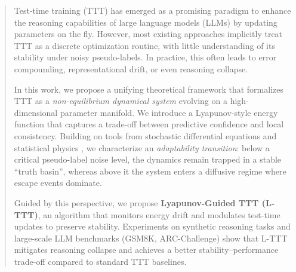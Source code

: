 \documentclass{article}
\theoremstyle{plain}
\theoremstyle{definition}
\theoremstyle{remark}
\begin{document}

\printAffiliationsAndNotice{\icmlEqualContribution} 

\begin{abstract}
Test-time training (TTT) has emerged as a promising paradigm to enhance the reasoning capabilities of large language models (LLMs) by updating parameters on the fly. However, most existing approaches implicitly treat TTT as a discrete optimization routine, with little understanding of its stability under noisy pseudo-labels. In practice, this often leads to error compounding, representational drift, or even reasoning collapse. 

In this work, we propose a unifying theoretical framework that formalizes TTT as a \emph{non-equilibrium dynamical system} evolving on a high-dimensional parameter manifold. We introduce a Lyapunov-style energy function that captures a trade-off between predictive confidence and local consistency. Building on tools from stochastic differential equations and statistical physics \cite{strogatz2018,khalil2002lyapunov,welling2011bayesian,bahri2024statmech,liu2024physics}, we characterize an \emph{adaptability transition}: below a critical pseudo-label noise level, the dynamics remain trapped in a stable ``truth basin'', whereas above it the system enters a diffusive regime where escape events dominate.

Guided by this perspective, we propose \textbf{Lyapunov-Guided TTT (L-TTT)}, an algorithm that monitors energy drift and modulates test-time updates to preserve stability. Experiments on synthetic reasoning tasks and large-scale LLM benchmarks (GSM8K, ARC-Challenge) show that L-TTT mitigates reasoning collapse and achieves a better stability–performance trade-off compared to standard TTT baselines.
\end{abstract}
\end{document}
